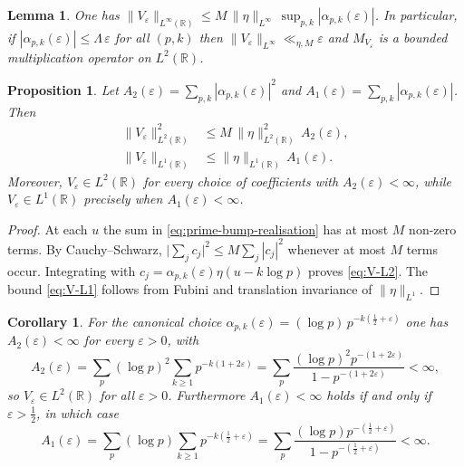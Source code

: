 ﻿\documentclass[12pt,a4paper]{article}
\newtheorem{lemma}[theorem]{Lemma}
\newtheorem{proposition}[theorem]{Proposition}
\newtheorem{corollary}[theorem]{Corollary}
\theoremstyle{definition}
\theoremstyle{remark}
\newcommand{\RR}{\mathbb{R}}
\begin{document}
\begin{lemma}\label{lem:V-Linfty}
One has $\|V_\varepsilon\|_{L^\infty(\RR)} \le M\,\|\eta\|_{L^\infty}\,\sup_{p,k} |\alpha_{p,k}(\varepsilon)|$.  In particular, if $|\alpha_{p,k}(\varepsilon)|\le \Lambda\,\varepsilon$ for all $(p,k)$ then $\|V_\varepsilon\|_{L^\infty}\ll_{\eta,M}\varepsilon$ and $M_{V_\varepsilon}$ is a bounded multiplication operator on $L^2(\RR)$.
\end{lemma}

\begin{proposition}\label{prop:V-Lp}
Let $A_2(\varepsilon)=\sum_{p,k}|\alpha_{p,k}(\varepsilon)|^2$ and $A_1(\varepsilon)=\sum_{p,k}|\alpha_{p,k}(\varepsilon)|$. Then
\begin{align}
  \|V_\varepsilon\|_{L^2(\RR)}^2 &\le M\,\|\eta\|_{L^2(\RR)}^2\,A_2(\varepsilon),\label{eq:V-L2}\\
  \|V_\varepsilon\|_{L^1(\RR)} &\le \|\eta\|_{L^1(\RR)}\,A_1(\varepsilon).\label{eq:V-L1}
\end{align}
Moreover, $V_\varepsilon\in L^2(\RR)$ for every choice of coefficients with $A_2(\varepsilon)<\infty$, while $V_\varepsilon\in L^1(\RR)$ precisely when $A_1(\varepsilon)<\infty$.
\end{proposition}

\begin{proof}
At each $u$ the sum in \eqref{eq:prime-bump-realisation} has at most $M$ non-zero terms.  By Cauchy--Schwarz,
\(
  \bigl|\sum_j c_j\bigr|^2 \le M \sum_j |c_j|^2
\)
whenever at most $M$ terms occur.  Integrating with $c_j=\alpha_{p,k}(\varepsilon)\eta(u-k\log p)$ proves \eqref{eq:V-L2}.  The bound \eqref{eq:V-L1} follows from Fubini and translation invariance of $\|\eta\|_{L^1}$.
\end{proof}

\begin{corollary}\label{cor:canonical-V}
For the canonical choice $\alpha_{p,k}(\varepsilon)=(\log p)\,p^{-k(\frac12+\varepsilon)}$ one has $A_2(\varepsilon)<\infty$ for every $\varepsilon>0$, with
\begin{equation}\label{eq:canonical-A2}
  A_2(\varepsilon)
  = \sum_{p}(\log p)^2 \sum_{k\ge1} p^{-k(1+2\varepsilon)}
  = \sum_{p}\frac{(\log p)^2 p^{-(1+2\varepsilon)}}{1-p^{-(1+2\varepsilon)}} < \infty,
\end{equation}
so $V_\varepsilon\in L^2(\RR)$ for all $\varepsilon>0$.  Furthermore $A_1(\varepsilon)<\infty$ holds if and only if $\varepsilon>\tfrac12$, in which case
\begin{equation}\label{eq:canonical-A1}
  A_1(\varepsilon)
  = \sum_{p}(\log p) \sum_{k\ge1} p^{-k(\frac12+\varepsilon)}
  = \sum_{p}\frac{(\log p) p^{-(\frac12+\varepsilon)}}{1-p^{-(\frac12+\varepsilon)}} < \infty.
\end{equation}
\end{corollary}
\end{document}
